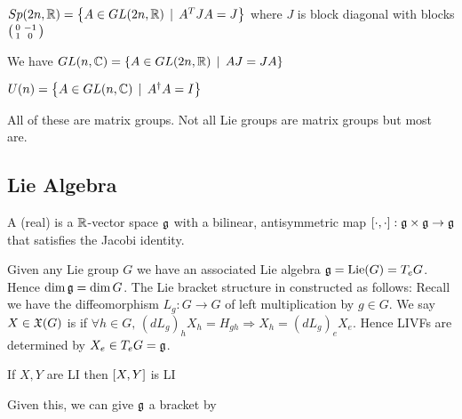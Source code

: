 \documentclass{article}
\begin{document}
\begin{example}
$Sp(2n,\mbb{R}) = \pbrace{A \in GL(2n,\mbb{R}) \, \mid \, A^T J A = J}$ where $J$ is block diagonal with blocks $\begin{psmallmatrix} 0 & -1 \\ 1 & 0 \end{psmallmatrix}$
\end{example}

\begin{example}
We have $GL(n,\mbb{C}) = \pbrace{A \in GL(2n,\mbb{R}) \, \mid \, AJ=JA}$
\end{example}

\begin{example}
$U(n) = \pbrace{A \in GL(n,\mbb{C}) \, \mid \, A^\dagger A = I}$
\end{example}

\begin{lemma}
\end{lemma}

\begin{remark}
All of these are matrix groups. Not all Lie groups are matrix groups but most are. 
\end{remark}

\subsection{Lie Algebra}

\begin{definition}
A (real)  is a $\mbb{R}$-vector space $\mf{g}$ with a bilinear, antisymmetric map $\comm[\cdot]{\cdot} : \mf{g} \times \mf{g} \to \mf{g}$ that satisfies the Jacobi identity. 
\end{definition}

Given any Lie group $G$ we have an associated Lie algebra $\mf{g} = \Lie(G) = T_eG$. Hence $\dim\mf{g} = \dim G$. The Lie bracket structure in constructed as follows: Recall we have the diffeomorphism $L_g : G \to G$ of left multiplication by $g \in G$. We say $X \in \mf{X}(G)$ is  if $\forall h \in G,\, (dL_g)_h X_h = H_{gh} \Rightarrow X_h = (dL_g)_e X_e$. Hence LIVFs are determined by $X_e\in T_e G = \mf{g}$. 
\begin{lemma}
If $X,Y$ are LI then $\comm[X]{Y}$ is LI
\end{lemma}
Given this, we can give $\mf{g}$ a bracket by 
\end{document}
